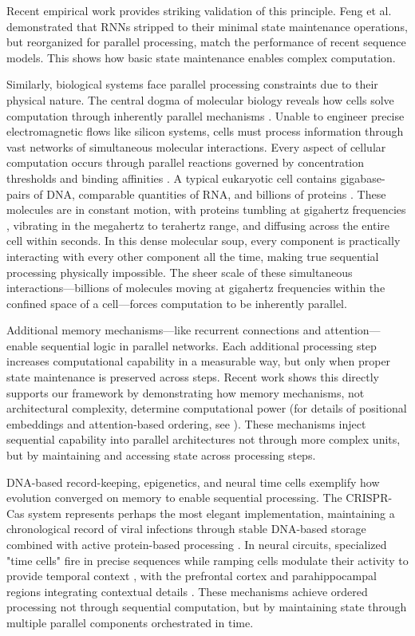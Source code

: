 \documentclass[12pt]{article}
\begin{document}
Recent empirical work provides striking validation of this principle.
Feng et al. \cite{feng2024rnns} demonstrated that RNNs stripped to their minimal state maintenance operations, but reorganized for parallel processing, match the performance of recent sequence models.
This shows how basic state maintenance enables complex computation.

Similarly, biological systems face parallel processing constraints due to their physical nature.
The central dogma of molecular biology reveals how cells solve computation through inherently parallel mechanisms \cite{wang2023parallel,cai2024efficient,fu2023scgrn}.
Unable to engineer precise electromagnetic flows like silicon systems, cells must process information through vast networks of simultaneous molecular interactions.
Every aspect of cellular computation occurs through parallel reactions governed by concentration thresholds and binding affinities \cite{alberts2022molecular}.
A typical eukaryotic cell contains gigabase-pairs of DNA, comparable quantities of RNA, and billions of proteins \cite{milo2013protein}.
These molecules are in constant motion, with proteins tumbling at gigahertz frequencies \cite{zhang2023molecular}, vibrating in the megahertz to terahertz range, and diffusing across the entire cell within seconds.
In this dense molecular soup, every component is practically interacting with every other component all the time, making true sequential processing physically impossible.
The sheer scale of these simultaneous interactions—billions of molecules moving at gigahertz frequencies within the confined space of a cell—forces computation to be inherently parallel.

Additional memory mechanisms—like recurrent connections and attention—enable sequential logic in parallel networks.
Each additional processing step increases computational capability in a measurable way, but only when proper state maintenance is preserved across steps.
Recent work shows this directly supports our framework by demonstrating how memory mechanisms, not architectural complexity, determine computational power (for details of positional embeddings and attention-based ordering, see \cite{merrill2023parallelism,merrill2024}).
These mechanisms inject sequential capability into parallel architectures not through more complex units, but by maintaining and accessing state across processing steps.

DNA-based record-keeping, epigenetics, and neural time cells exemplify how evolution converged on memory to enable sequential processing.
The CRISPR-Cas system represents perhaps the most elegant implementation, maintaining a chronological record of viral infections \cite{kim2019crispr} through stable DNA-based storage combined with active protein-based processing \cite{sadremomtaz2023digital}.
In neural circuits, specialized "time cells" fire in precise sequences while ramping cells modulate their activity to provide temporal context \cite{quentin2019differential}, with the prefrontal cortex and parahippocampal regions integrating contextual details \cite{martini2015information}.
These mechanisms achieve ordered processing not through sequential computation, but by maintaining state through multiple parallel components orchestrated in time.
\end{document}
